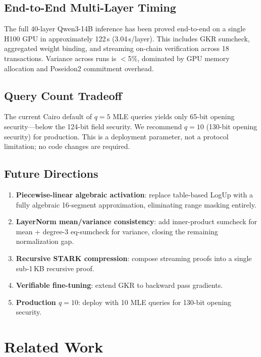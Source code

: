 \documentclass[10pt,twocolumn]{article}
\theoremstyle{definition}
\theoremstyle{remark}
\begin{document}
\subsection{End-to-End Multi-Layer Timing}

The full 40-layer Qwen3-14B inference has been proved end-to-end
on a single H100 GPU in approximately 122\,s (3.04\,s/layer).
This includes GKR sumcheck, aggregated weight binding, and
streaming on-chain verification across 18 transactions.
Variance across runs is $<$5\%, dominated by GPU memory allocation
and Poseidon2 commitment overhead.

\subsection{Query Count Tradeoff}

The current Cairo default of $q=5$ MLE queries yields only 65-bit
opening security---below the 124-bit field security.
We recommend $q=10$ (130-bit opening security) for production.
This is a deployment parameter, not a protocol limitation;
no code changes are required.

\subsection{Future Directions}

\begin{enumerate}[nosep,leftmargin=1.4em]
  \item \textbf{Piecewise-linear algebraic activation}: replace
        table-based LogUp with a fully algebraic 16-segment
        approximation, eliminating range masking entirely.
  \item \textbf{LayerNorm mean/variance consistency}: add
        inner-product sumcheck for mean + degree-3 eq-sumcheck
        for variance, closing the remaining normalization gap.
  \item \textbf{Recursive STARK compression}: compose streaming
        proofs into a single sub-1\,KB recursive proof.
  \item \textbf{Verifiable fine-tuning}: extend GKR to backward
        pass gradients.
  \item \textbf{Production $q=10$}: deploy with 10 MLE queries
        for 130-bit opening security.
\end{enumerate}


\section{Related Work}\label{sec:related}
\end{document}
